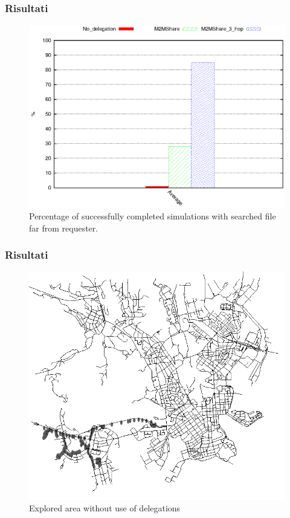 \documentclass{beamer}
\begin{document}
\begin{frame}
\frametitle{Risultati}
\begin{center}
\begin{figure}[ht]
\includegraphics[scale=0.7]{../grafici/percCompletaMultiHop.eps}
\caption{Percentage of successfully completed simulations with searched file far from requester.}
\end{figure}
\end{center}
\end{frame}

\begin{frame}
\frametitle{Risultati}
\begin{center}
\begin{figure}[ht]
\includegraphics[scale=0.25]{../figure/mappa_0_hop.png}
    \caption{Explored area without use of delegations}
\end{figure}
\end{center}
\end{frame}
\end{document}
